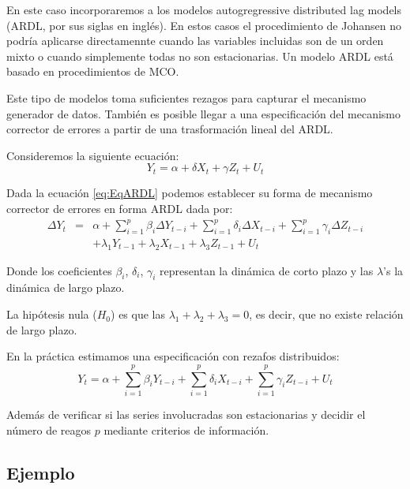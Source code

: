 \documentclass[
]{book}
\begin{document}
En este caso incorporaremos a los modelos autogregressive distributed
lag models (ARDL, por sus siglas en inglés). En estos casos el
procedimiento de Johansen no podría aplicarse directamennte cuando las
variables incluidas son de un orden mixto o cuando simplemente todas no
son estacionarias. Un modelo ARDL está basado en procedimientos de MCO.

Este tipo de modelos toma suficientes rezagos para capturar el mecanismo
generador de datos. También es posible llegar a una especificación del
mecanismo corrector de errores a partir de una trasformación lineal del
ARDL.

Consideremos la siguiente ecuación:
\begin{equation}
    Y_t = \alpha + \delta X_t + \gamma Z_t + U_t
    \label{eq:EqARDL}
\end{equation}

Dada la ecuación \eqref{eq:EqARDL} podemos establecer su forma de
mecanismo corrector de errores en forma ARDL dada por: \begin{eqnarray*}
    \Delta Y_t & = & \alpha + \sum_{i = 1}^p \beta_i \Delta Y_{t-i} + \sum_{i = 1}^p \delta_i \Delta X_{t-i} + \sum_{i = 1}^p \gamma_i \Delta Z_{t-i} \\ 
    &  & + \lambda_1 Y_{t-1} + \lambda_2 X_{t-1} + \lambda_3 Z_{t-1} + U_t
\end{eqnarray*}

Donde los coeficientes \(\beta_i\), \(\delta_i\), \(\gamma_i\) representan la
dinámica de corto plazo y las \(\lambda\)'s la dinámica de largo plazo.

La hipótesis nula (\(H_0\)) es que las
\(\lambda_1 + \lambda_2 + \lambda_3 = 0\), es decir, que no existe
relación de largo plazo.

En la práctica estimamos una especificación con rezafos distribuidos:
\begin{equation}
    Y_t = \alpha + \sum_{i = 1}^p \beta_i Y_{t-i} + \sum_{i = 1}^p \delta_i X_{t-i} + \sum_{i = 1}^p \gamma_i Z_{t-i} + U_t
\end{equation}

Además de verificar si las series involucradas son estacionarias y
decidir el número de reagos \(p\) mediante criterios de información.

\hypertarget{ejemplo}{%
\subsection{Ejemplo}\label{ejemplo}}
\end{document}
